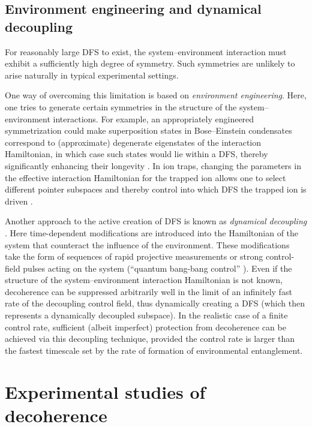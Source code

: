 \documentclass[aps,pra,reprint,amsmath,amssymb,showpacs,nofootinbib,floatfix,onecolumn,12pt]{revtex4-1}
\begin{document}
\subsection{Environment engineering and dynamical decoupling}

For reasonably large DFS to exist, the system--environment interaction must exhibit a sufficiently high degree of symmetry. Such symmetries are unlikely to arise naturally in typical experimental settings.

One way of overcoming this limitation is based on \emph{environment engineering}. Here, one tries to generate
certain symmetries in the structure of the system--environment interactions. For example, an appropriately engineered symmetrization could make superposition states in Bose--Einstein condensates correspond to (approximate) degenerate eigenstates of the interaction Hamiltonian, in which case such states would lie within a DFS, thereby significantly enhancing their longevity \cite{Dalvit:2000:bb}. In ion traps, changing the parameters in the effective interaction Hamiltonian for the trapped ion allows one to select different pointer subspaces and thereby control into which DFS the trapped ion is driven \cite{Poyatos:1996:um,Myatt:2000:yy,Turchette:2000:aa,Carvalho:2001:ua}. 

Another approach to the active creation of DFS is known as \emph{dynamical decoupling} \cite{Viola:1998:uu,Viola:1999:zp,Zanardi:1999:oo,%
  Viola:2000:pp,Wu:2002:aa,Wu:2002:bb}. Here time-dependent modifications are introduced into the Hamiltonian of the system that counteract the influence of the environment. These modifications take the form of sequences of rapid projective measurements or strong control-field pulses acting on the system (``quantum bang-bang control'' \cite{Viola:1998:uu}). Even if the structure of the system--environment interaction Hamiltonian is not known, decoherence can be suppressed arbitrarily well in the limit of an infinitely fast rate of the decoupling control field, thus dynamically creating a DFS (which then represents a dynamically decoupled subspace).  In the realistic case of a finite control rate, sufficient (albeit imperfect) protection from decoherence can be achieved via this decoupling technique, provided the control rate is larger than the fastest timescale set by the rate of formation of environmental entanglement.


\section{\label{sec:exper-observ-decoh}Experimental studies of decoherence}
\end{document}
